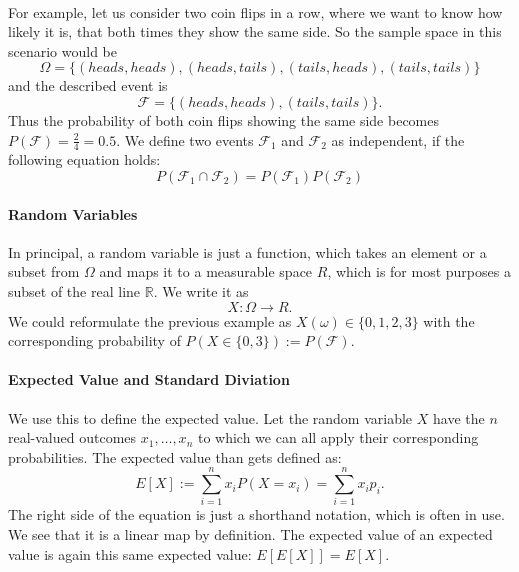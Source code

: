 \paragraph*{}
For example, let us consider two coin flips in a row, where we want to know how likely it is, that both times they show the same side. So the sample space in this scenario would be 
\begin{equation}
\Omega = \{(heads,heads),(heads,tails),(tails,heads),(tails,tails)\}
\end{equation}
and the described event is 
\begin{equation}
\mathcal{F} = \{(heads,heads),(tails,tails)\}.
\end{equation}
Thus the probability of both coin flips showing the same side becomes $P(\mathcal{F}) = \tfrac{2}{4} = 0.5$. We define two events $ \mathcal{F}_1 $ and $ \mathcal{F}_2 $ as independent, if the following equation holds:
\begin{equation}
P(\mathcal{F}_1\cap\mathcal{F}_2) = P(\mathcal{F}_1)P(\mathcal{F}_2)
\end{equation}

\paragraph*{Random Variables}
In principal, a random variable is just a function, which takes an element or a subset from $ \Omega $ and maps it to a measurable space $ R $, which is for most purposes a subset of the real line $ \mathbb{R} $. We write it as 
\begin{equation}
X:\Omega \rightarrow R.
\end{equation}
We could reformulate the previous example as $ X(\omega) \in \{0,1,2,3\} $ with the corresponding probability of $ P(X\in \{0,3\}) := P(\mathcal{F}) $.

\paragraph*{Expected Value and Standard Diviation}
We use this to define the expected value. Let the random variable $ X $ have the $n$ real-valued outcomes $ x_1,\dots , x_n $ to which we can all apply their corresponding probabilities. The expected value than gets defined as:
\begin{equation}\label{eq:expected_value}
E[X] := \sum\limits_{i=1}^n x_i P(X=x_i) = \sum\limits_{i=1}^n x_i p_i.
\end{equation}
The right side of the equation is just a shorthand notation, which is often in use. We see that it is a linear map by definition. The expected value of an expected value is again this same expected value: $ E[E[X]] = E[X] $.

